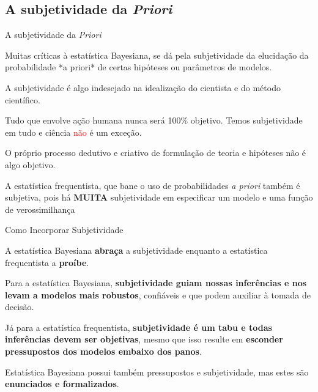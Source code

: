 \subsection{A subjetividade da \textit{Priori}}
\begin{frame}{A subjetividade da \textit{Priori}}
	\begin{vfilleditems}
		\item Muitas críticas à estatística Bayesiana, se dá pela subjetividade da
		elucidação da probabilidade *a priori* de certas hipóteses ou parâmetros de
		modelos.
		\item A subjetividade é algo indesejado na idealização do cientista e do
		método científico.
		\item Tudo que envolve ação humana nunca será 100\% objetivo.
		Temos subjetividade em tudo e ciência \textcolor{red}{não} é um exceção.
		\item O próprio processo dedutivo e criativo de formulação de teoria e
		hipóteses não é algo objetivo.
		\item A estatística frequentista, que bane o uso de probabilidades \textit{a priori}
		também é subjetiva, pois há \textbf{MUITA} subjetividade em especificar um modelo
		e uma função de verossimilhança \parencite{jaynesProbabilityTheoryLogic2003, vandeschootBayesianStatisticsModelling2021}
	\end{vfilleditems}
\end{frame}

\begin{frame}{Como Incorporar Subjetividade}
	\begin{vfilleditems}
		\item A estatística Bayesiana \textbf{abraça} a subjetividade enquanto a
		estatística frequentista a \textbf{proíbe}.
		\item Para a estatística Bayesiana, \textbf{subjetividade guiam nossas inferências e nos levam a modelos mais robustos},
		confiáveis e que podem auxiliar à tomada de decisão.
		\item Já para a estatística frequentista, \textbf{subjetividade é um tabu e todas inferências devem ser objetivas},
		mesmo que isso resulte em \textbf{esconder pressupostos dos modelos embaixo dos panos}.
		\item Estatística Bayesiana possui também pressupostos e subjetividade,
		mas estes são \textbf{enunciados e formalizados}.
	\end{vfilleditems}
\end{frame}

